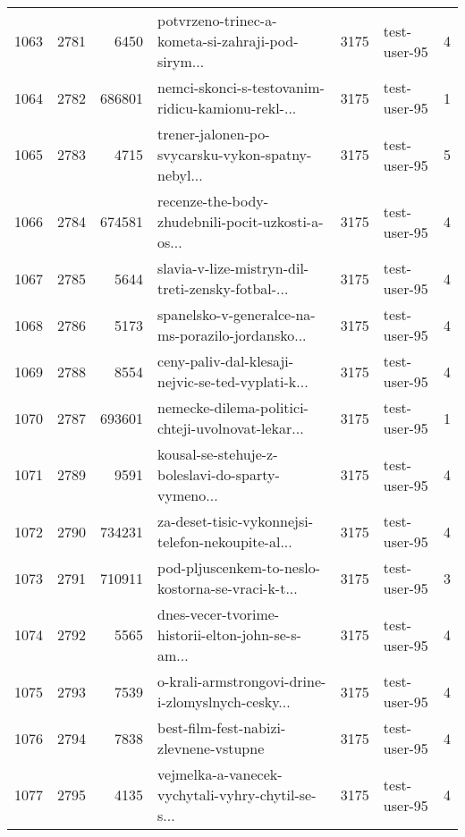 \begin{tabular}{lrrlrlr}
1063 &       2781 &     6450 &  potvrzeno-trinec-a-kometa-si-zahraji-pod-sirym... &     3175 &                 test-user-95 &               4 \\
1064 &       2782 &   686801 &  nemci-skonci-s-testovanim-ridicu-kamionu-rekl-... &     3175 &                 test-user-95 &               1 \\
1065 &       2783 &     4715 &  trener-jalonen-po-svycarsku-vykon-spatny-nebyl... &     3175 &                 test-user-95 &               5 \\
1066 &       2784 &   674581 &  recenze-the-body-zhudebnili-pocit-uzkosti-a-os... &     3175 &                 test-user-95 &               4 \\
1067 &       2785 &     5644 &  slavia-v-lize-mistryn-dil-treti-zensky-fotbal-... &     3175 &                 test-user-95 &               4 \\
1068 &       2786 &     5173 &  spanelsko-v-generalce-na-ms-porazilo-jordansko... &     3175 &                 test-user-95 &               4 \\
1069 &       2788 &     8554 &  ceny-paliv-dal-klesaji-nejvic-se-ted-vyplati-k... &     3175 &                 test-user-95 &               4 \\
1070 &       2787 &   693601 &  nemecke-dilema-politici-chteji-uvolnovat-lekar... &     3175 &                 test-user-95 &               1 \\
1071 &       2789 &     9591 &  kousal-se-stehuje-z-boleslavi-do-sparty-vymeno... &     3175 &                 test-user-95 &               4 \\
1072 &       2790 &   734231 &  za-deset-tisic-vykonnejsi-telefon-nekoupite-al... &     3175 &                 test-user-95 &               4 \\
1073 &       2791 &   710911 &  pod-pljuscenkem-to-neslo-kostorna-se-vraci-k-t... &     3175 &                 test-user-95 &               3 \\
1074 &       2792 &     5565 &  dnes-vecer-tvorime-historii-elton-john-se-s-am... &     3175 &                 test-user-95 &               4 \\
1075 &       2793 &     7539 &  o-krali-armstrongovi-drine-i-zlomyslnych-cesky... &     3175 &                 test-user-95 &               4 \\
1076 &       2794 &     7838 &             best-film-fest-nabizi-zlevnene-vstupne &     3175 &                 test-user-95 &               4 \\
1077 &       2795 &     4135 &  vejmelka-a-vanecek-vychytali-vyhry-chytil-se-s... &     3175 &                 test-user-95 &               4 \\

\end{tabular}
